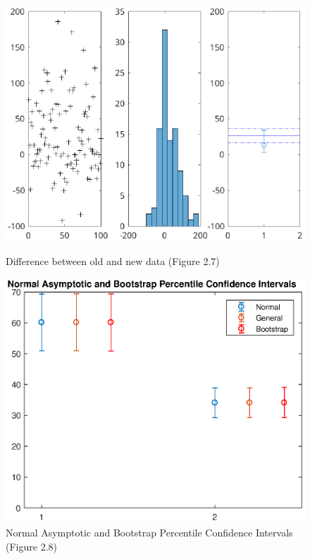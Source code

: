 \documentclass[11pt,a4paper]{article}
\begin{document}
\begin{figure}[ht]
	\centering
	\begin{minipage}{0.45\textwidth}
		\centering
		\includegraphics[width=\textwidth]{ex1fig2_7}
		\caption{Difference between old and new data (Figure 2.7) }
		\label{fig:diff_exec}
	\end{minipage}
	\begin{minipage}{0.45\textwidth}
		\centering
		\includegraphics[width=\textwidth]{ex1fig2_8}
		\caption{Normal Asymptotic and Bootstrap Percentile Confidence Intervals (Figure 2.8)}
		\label{fig:figure2_8}
	\end{minipage}
\end{figure}
\end{document}
